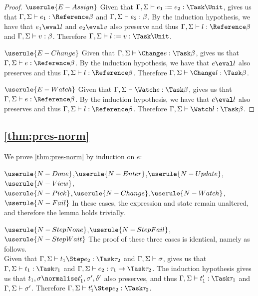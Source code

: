 \begin{proof}
  \case
    {$\userule{E-Assign}$}
    {Given that $\Gamma,\Sigma\infers e_1 := e_2 :\Task \Unit$,  gives us that $\Gamma,\Sigma\infers e_1:\Reference \beta$ and $\Gamma,\Sigma\vdash e_2:\beta$.
    By the induction hypothesis, we have that $e_1\eval l$ and $e_2\eval v$ also preserve and thus $\Gamma,\Sigma\infers l:\Reference \beta$ and $\Gamma,\Sigma\vdash v:\beta$.
    Therefore $\Gamma,\Sigma\infers l:=v:\Task \Unit$. }

  \case
    {$\userule{E-Change}$}
    {Given that $\Gamma,\Sigma\infers \Change e :\Task \beta$,  gives us that $\Gamma,\Sigma\infers e:\Reference \beta$.
    By the induction hypothesis, we have that $e\eval l$ also preserves and thus $\Gamma,\Sigma\infers l:\Reference \beta$.
    Therefore $\Gamma,\Sigma\infers \Change l:\Task\beta$.}

  \case
    {$\userule{E-Watch}$}
    {Given that $\Gamma,\Sigma\infers \Watch e :\Task \beta$,  gives us that $\Gamma,\Sigma\infers e:\Reference \beta$.
    By the induction hypothesis, we have that $e\eval l$ also preserves and thus $\Gamma,\Sigma\infers l:\Reference \beta$.
    Therefore $\Gamma,\Sigma\infers \Watch l:\Task\beta$.}
\end{proof}


\subsection{\cref{thm:pres-norm}}

We prove \cref{thm:pres-norm} by induction on $e$:

\case
  {$\userule{N-Done}$,$\userule{N-Enter}$,$\userule{N-Update}$,$\userule{N-View}$,\\$\userule{N-Pick}$,$\userule{N-Change}$,$\userule{N-Watch}$,$\userule{N-Fail}$}
  {In these cases, the expression and state remain unaltered, and therefore the lemma holds trivially.}

\case
  {$\userule{N-StepNone}$,$\userule{N-StepFail}$,\\$\userule{N-StepWait}$}
  {The proof of these three cases is identical, namely as follows.\\
  Given that $\Gamma,\Sigma\infers t_1\Step e_2:\Task\tau_2$ and $\Gamma,\Sigma\vdash \sigma$,  gives us that $\Gamma,\Sigma\infers t_1:\Task\tau_1$ and $\Gamma,\Sigma\infers e_2:\tau_1\to\Task \tau_2$.
  The induction hypothesis gives us that $t_1,\sigma\normalise t_1',\sigma',\delta'$ also preserves, and thus $\Gamma,\Sigma\infers t_1':\Task\tau_1$ and $\Gamma,\Sigma\vdash\sigma'$.
  Therefore $\Gamma,\Sigma\infers t_1'\Step e_2:\Task\tau_2$.}

